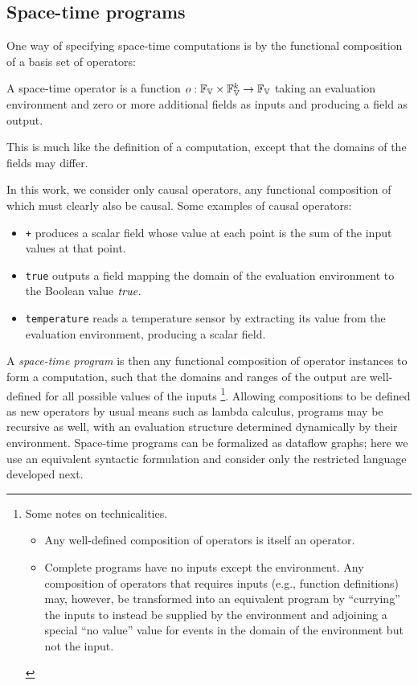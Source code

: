 \documentclass[12pt,a4paper,twoside,openright]{book}
\begin{document}
\subsection{Space-time programs}

One way of specifying space-time computations is by the functional composition of a basis set of operators:
%
\begin{thrdefn}\label{def:operator}
A space-time operator is a function 
$o: \fieldsof{\spaceof{\datavalue}} \times \fieldsof{\spaceof{\datavalue}}^k \rightarrow \fieldsof{\spaceof{\datavalue}}$
taking an evaluation environment and zero or more additional fields
as inputs and producing a field as output.
\end{thrdefn}
\noindent
This is much like the definition of a computation, except that the domains of the fields may differ.

In this work, we consider only causal operators, any functional composition of which must clearly also be causal.
%
Some examples of causal operators:
\begin{itemize}
\item {\tt +} produces a scalar field whose value at each point is the sum of the input values at that point.
\item {\tt true} outputs a field mapping the domain of the evaluation environment to the Boolean value $\textit{true}$.
\item {\tt temperature} reads a temperature sensor by extracting its value from the evaluation environment, producing a scalar field.
\end{itemize}

A {\em space-time program} is then any functional composition of operator instances to form a computation, such that the domains and ranges of the output are well-defined for all possible values of the inputs
\footnote{Some notes on technicalities.
	\begin{itemize}
		\item Any well-defined composition of operators is itself an operator.
		\item Complete programs have no inputs except the environment.  Any composition of operators that requires inputs (e.g., function definitions) may, however, be transformed into an equivalent program by ``currying'' the inputs to instead be supplied by the environment and adjoining a special ``no value'' value for events in the domain of the environment but not the input.
	\end{itemize}
}.
%
Allowing compositions to be defined as new operators by usual means such as lambda calculus, programs may be recursive as well, with an evaluation structure determined dynamically by their environment.
%
Space-time programs can be formalized as dataflow graphs\cite{BealUsbeck12,BVD-SCW14}; here we use an equivalent syntactic formulation and consider only the restricted language developed next.
\end{document}
